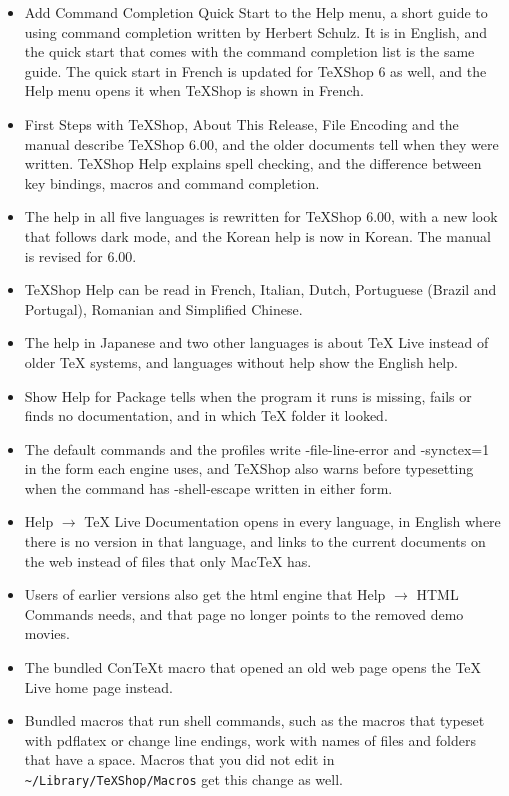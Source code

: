 \documentclass[11pt,letterpaper]{article}
\begin{document}
\begin{itemize}
\item Add Command Completion Quick Start to the Help menu, a short guide to using command completion written by Herbert Schulz. It is in English, and the quick start that comes with the command completion list is the same guide. The quick start in French is updated for TeXShop 6 as well, and the Help menu opens it when TeXShop is shown in French.
\item First Steps with TeXShop, About This Release, File Encoding and the manual describe TeXShop 6.00, and the older documents tell when they were written. TeXShop Help explains spell checking, and the difference between key bindings, macros and command completion.
\item The help in all five languages is rewritten for TeXShop 6.00, with a new look that follows dark mode, and the Korean help is now in Korean. The manual is revised for 6.00.
\item TeXShop Help can be read in French, Italian, Dutch, Portuguese (Brazil and Portugal), Romanian and Simplified Chinese.
\item The help in Japanese and two other languages is about TeX Live instead of older TeX systems, and languages without help show the English help.
\item Show Help for Package tells when the program it runs is missing, fails or finds no documentation, and in which TeX folder it looked.
\item The default commands and the profiles write -file-line-error and -synctex=1 in the form each engine uses, and TeXShop also warns before typesetting when the command has -shell-escape written in either form.
\item Help \(\rightarrow\) TeX Live Documentation opens in every language, in English where there is no version in that language, and links to the current documents on the web instead of files that only MacTeX has.
\item Users of earlier versions also get the html engine that Help \(\rightarrow\) HTML Commands needs, and that page no longer points to the removed demo movies.
\item The bundled ConTeXt macro that opened an old web page opens the TeX Live home page instead.
\item Bundled macros that run shell commands, such as the macros that typeset with pdflatex or change line endings, work with names of files and folders that have a space. Macros that you did not edit in \texttt{\textasciitilde{}/Library/TeXShop/Macros} get this change as well.

\end{itemize}
\end{document}
